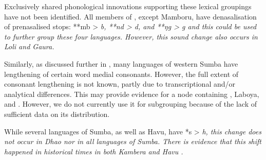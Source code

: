 Exclusively shared phonological innovations supporting these
lexical groupings have not been identified.
All members of ,
except Mamboru, have denasalisation of prenasalised stops: **mb
> \it{b}, **nd > \it{d}, and **ŋg > \it{g}
and this could be used to further group these four languages.
However, this sound change also occurs in Loli and Gaura.

Similarly, as discussed further in ,
many languages of western Sumba
have lengthening of certain word medial consonants.
However, the full extent of consonant lengthening is not known,
partly due to transcriptional and/or analytical differences.
This may provide evidence for a node containing , Laboya, and .
However, we do not currently use it for subgrouping because of
the lack of sufficient data on its distribution.

While several languages of Sumba,
as well as Havu, have *s > \it{h},
this change does not occur in Dhao nor in all languages of Sumba.
There is evidence that this shift happened in historical
times in both Kambera \citep[12]{Klamer1998a} and Havu \citep[3]{WalkerA1982}.
